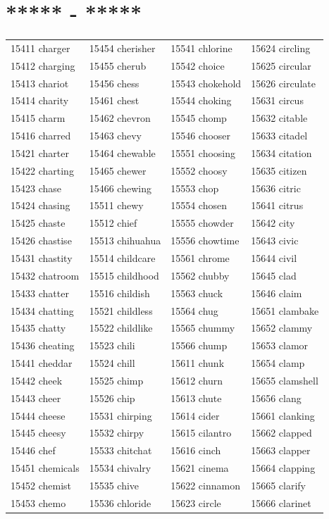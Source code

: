 \documentclass[10pt, oneside]{book}
\begin{document}
\begin{table}
	\centering
	\section*{***** - *****}
	\begin{tabular}{l l l l}
15411 charger &15454 cherisher &15541 chlorine &15624 circling\\
15412 charging &15455 cherub &15542 choice &15625 circular\\
15413 chariot &15456 chess &15543 chokehold &15626 circulate\\
15414 charity &15461 chest &15544 choking &15631 circus\\
15415 charm &15462 chevron &15545 chomp &15632 citable\\
15416 charred &15463 chevy &15546 chooser &15633 citadel\\
15421 charter &15464 chewable &15551 choosing &15634 citation\\
15422 charting &15465 chewer &15552 choosy &15635 citizen\\
15423 chase &15466 chewing &15553 chop &15636 citric\\
15424 chasing &15511 chewy &15554 chosen &15641 citrus\\
15425 chaste &15512 chief &15555 chowder &15642 city\\
15426 chastise &15513 chihuahua &15556 chowtime &15643 civic\\
15431 chastity &15514 childcare &15561 chrome &15644 civil\\
15432 chatroom &15515 childhood &15562 chubby &15645 clad\\
15433 chatter &15516 childish &15563 chuck &15646 claim\\
15434 chatting &15521 childless &15564 chug &15651 clambake\\
15435 chatty &15522 childlike &15565 chummy &15652 clammy\\
15436 cheating &15523 chili &15566 chump &15653 clamor\\
15441 cheddar &15524 chill &15611 chunk &15654 clamp\\
15442 cheek &15525 chimp &15612 churn &15655 clamshell\\
15443 cheer &15526 chip &15613 chute &15656 clang\\
15444 cheese &15531 chirping &15614 cider &15661 clanking\\
15445 cheesy &15532 chirpy &15615 cilantro &15662 clapped\\
15446 chef &15533 chitchat &15616 cinch &15663 clapper\\
15451 chemicals &15534 chivalry &15621 cinema &15664 clapping\\
15452 chemist &15535 chive &15622 cinnamon &15665 clarify\\
15453 chemo &15536 chloride &15623 circle &15666 clarinet\\
	\end{tabular}
 \end{table}
\end{document}
